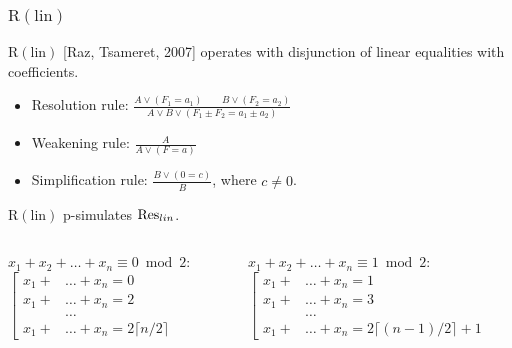 \begin{frame}
    \frametitle{$\mathrm{R(lin)}$}

    $\mathrm{R(lin)}$ [Raz, Tsameret, 2007] operates with disjunction of linear equalities with
     coefficients.
    
	\begin{itemize}
		\item Resolution rule: $\frac{A \lor (F_1 = a_1) \qquad B \lor (F_2 = a_2)}
    		{A \lor B \lor (F_1 \pm F_2 = a_1 \pm a_2)}$
		\item Weakening rule: $\frac{A}{A \lor (F = a)}$
		\item Simplification rule: $\frac{B \lor (0 = c)}{B}$, where $c \neq 0$. 
	\end{itemize}

	\pause
    \begin{theorem}
    	$\mathrm{R(lin)}$ p-simulates $\mathrm{Res}_{lin}$.    
    \end{theorem}
    
	\medskip

	\pause
	\begin{columns}
		\begin{column}{5cm}
			$x_1 + x_2 + \dots + x_n \equiv 0 \bmod 2$:
			$\left[\begin{aligned}
            	x_1 + &\dots + x_n = 0\\
                x_1 + &\dots + x_n = 2\\
                &\dots \\
                x_1 + &\dots + x_n = 2 \lceil n / 2 \rceil
            \end{aligned}\right.$ 
		\end{column}
		\begin{column}{5cm}
			$x_1 + x_2 + \dots + x_n \equiv 1 \bmod 2$:
			$\left[\begin{aligned}
                x_1 + &\dots + x_n = 1\\
                x_1 + &\dots + x_n = 3\\
                &\dots \\
                x_1 + &\dots + x_n = 2 \lceil (n - 1) / 2 \rceil + 1
            \end{aligned}\right.$
		\end{column}
	\end{columns}
\end{frame}


